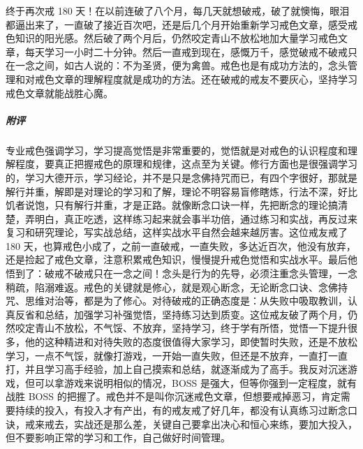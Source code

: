 \begin{case}
    终于再次戒 180 天！在以前连破了八个月，每几天就想破戒，破了就懊悔，眼泪都逼出来了，一直破了接近百次吧，还是后几个月开始重新学习戒色文章，感受戒色知识的阳光感。然后破了两个月后，仍然咬定青山不放松地加大量学习戒色文章，每天学习一小时二十分钟。然后一直戒到现在，感慨万千，感觉破戒不破戒只在一念之间，如古人说的：不为圣贤，便为禽兽。戒色也是有成功方法的，念头管理和对戒色文章的理解程度就是成功的方法。还在破戒的戒友不要灰心，坚持学习戒色文章就能战胜心魔。
    \subparagraph{附评} 专业戒色强调学习，学习提高觉悟是非常重要的，觉悟就是对戒色的认识程度和理解程度，要真正把握戒色的原理和规律，这点至为关键。修行方面也是很强调学习的，学习大德开示，学习经论，并不是只是念佛持咒而已，有四个字很好，那就是解行并重，解即是对理论的学习和了解，理论不明容易盲修瞎炼，行法不深，好比饥者说饱，只有解行并重，才是正路。就像断念口诀一样，先把断念的理论搞清楚，弄明白，真正吃透，这样练习起来就会事半功倍，通过练习和实战，再反过来复习和研究理论，写实战总结，这样实战水平自然会越来越厉害。这位戒友戒了 180 天，也算戒色小成了，之前一直破戒，一直失败，多达近百次，他没有放弃，还是捡起了戒色文章，注意积累戒色知识，慢慢提升戒色觉悟和实战水平。最后他悟到了：破戒不破戒只在一念之间！念头是行为的先导，必须注重念头管理，一念稍疏，陷溺难返。戒色的关键就是修心，就是观心断念，无论断念口诀、念佛持咒、思维对治等，都是为了修心。对待破戒的正确态度是：从失败中吸取教训，认真反省和总结，加强学习补强觉悟，坚持练习达到质变。这位戒友破了两个月，仍然咬定青山不放松，不气馁、不放弃，坚持学习，终于学有所悟，觉悟一下提升很多，他的这种精进和对待失败的态度很值得大家学习，即使暂时失败，还是不放松学习，一点不气馁，就像打游戏，一开始一直失败，但还是不放弃，一直打一直打，并且学习高手经验，加上自己摸索和总结，就逐渐成为了高手。我反对沉迷游戏，但可以拿游戏来说明相似的情况，BOSS 是强大，但等你强到一定程度，就有战胜 BOSS 的把握了。戒色并不是叫你沉迷戒色文章，但想要戒掉恶习，肯定需要持续的投入，有投入才有产出，有的戒友戒了好几年，都没有认真练习过断念口诀，戒来戒去，实战还是那么差，关键自己要拿出决心和恒心来练，要加大投入，但不要影响正常的学习和工作，自己做好时间管理。
\end{case}


